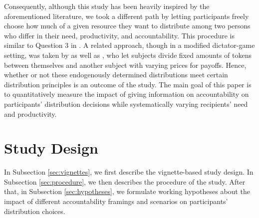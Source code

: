 \documentclass[smallcondensed]{svjour3}
\begin{document}
%
Consequently, although this study has been heavily inspired by the aforementioned literature, we took a different path by letting participants freely choose how much of a given resource they want to distribute among two persons who differ in their need, productivity, and accountability. This procedure is similar to Question 3 in \citep{konow_is_2009}. A related approach, though in a modified dictator-game setting, was taken by \citet{andreoni_giving_2002} as well as \citet{fisman_individual_2007}, who let subjects divide fixed amounts of tokens between themselves and another subject with varying prices for payoffs. Hence, whether or not these endogenously determined distributions meet certain distribution principles is an outcome of the study. The main goal of this paper is to quantitatively measure the impact of giving information on accountability on participants' distribution decisions while systematically varying recipients' need and productivity.\par
%
\section{Study Design}\label{sec:design}
%
In Subsection \ref{sec:vignettes}, we first describe the vignette-based study design. In Subsection \ref{sec:procedure}, we then describes the procedure of the study. After that, in Subsection \ref{sec:hypotheses}, we formulate working hypotheses about the impact of different accountability framings and scenarios on participants' distribution choices.\par
%
\end{document}
